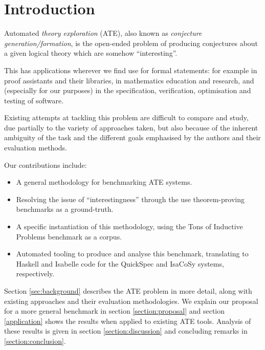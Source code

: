 \section{Introduction}
\label{intro}


Automated \emph{theory exploration} (ATE), also known as
\emph{conjecture generation/formation}, is the open-ended problem of producing
conjectures about a given logical theory which are somehow ``interesting''.

This has applications wherever we find use for formal statements: for example in
proof assistants and their libraries, in mathematics education and research, and
(especially for our purposes) in the specification, verification, optimisation
and testing of software.

Existing attempts at tackling this problem are difficult to compare and study,
due partially to the variety of approaches taken, but also because of the
inherent ambiguity of the task and the different goals emphasised by the authors
and their evaluation methods.

Our contributions include:

\begin{itemize}
\item A general methodology for benchmarking ATE systems.
\item Resolving the issue of ``interestingness'' through the use theorem-proving
  benchmarks as a ground-truth.
\item A specific instantiation of this methodology, using the Tons of Inductive
  Problems benchmark as a corpus.
\item Automated tooling to produce and analyse this benchmark, translating to
  Haskell and Isabelle code for the QuickSpec and IsaCoSy systems, respectively.
\end{itemize}

Section \ref{sec:background} describes the ATE problem in more detail, along
with existing approaches and their evaluation methodologies. We explain our
proposal for a more general benchmark in section \ref{section:proposal} and
section \ref{application} shows the results when applied to existing ATE tools.
Analysis of these results is given in section \ref{section:discussion} and
concluding remarks in \ref{section:conclusion}.

